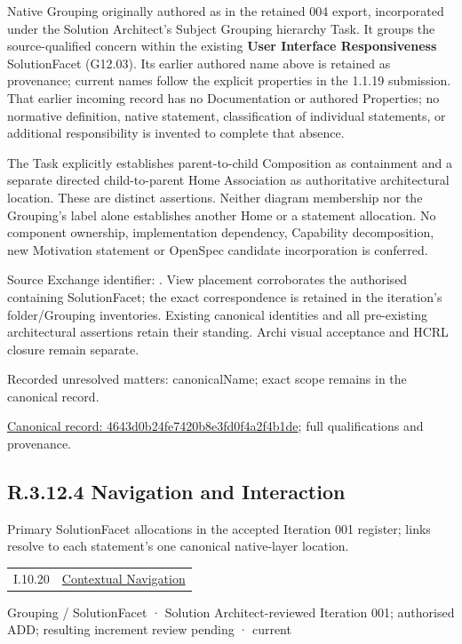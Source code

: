 Native Grouping originally authored as \texttt{} in the retained 004 export,
incorporated under the Solution Architect's Subject Grouping hierarchy Task.
It groups the source-qualified \texttt{} concern within
the existing \textbf{User Interface Responsiveness} SolutionFacet (G12.03). Its earlier authored name above is retained as provenance; current names
follow the explicit properties in the 1.1.19 submission.
That earlier incoming record has no Documentation or authored Properties; no normative
definition, native statement, classification of individual statements, or
additional responsibility is invented to complete that absence.



The Task explicitly establishes parent-to-child Composition as containment and
a separate directed child-to-parent Home Association as authoritative architectural
location. These are distinct assertions. Neither diagram membership nor the
Grouping's label alone establishes another Home or a statement allocation.
No component ownership, implementation dependency, Capability decomposition,
new Motivation statement or OpenSpec candidate incorporation is conferred.



Source Exchange identifier: \texttt{}. View placement corroborates
the authorised containing SolutionFacet; the exact correspondence is retained in the
iteration's folder/Grouping inventories. Existing canonical identities and all
pre-existing architectural assertions retain their standing. Archi visual
acceptance and HCRL closure remain separate.


{\small Recorded unresolved matters: canonicalName; exact scope remains in the canonical record.}\par
{\footnotesize \href{../../../../../../../continuum/grouping/4643d0b24fe7420b8e3fd0f4a2f4b1de.md}{Canonical record: 4643d0b24fe7420b8e3fd0f4a2f4b1de}; full qualifications and provenance.}\par
\subsection*{R.3.12.4 Navigation and Interaction}
\label{navigation:R.3.12.4}

Primary SolutionFacet allocations in the accepted Iteration 001 register; links resolve to each statement’s one canonical native-layer location.\par
\begin{longtable}{p{.22\linewidth}p{.73\linewidth}}
I.10.20 & \hyperref[element:39d698ff446d48ab9358844666fcafe5]{Contextual Navigation} \\
\end{longtable}
\label{element:9f192036bee542ad883b89729a35bbfb}
{\small Grouping / SolutionFacet · Solution Architect-reviewed Iteration 001; authorised ADD; resulting increment review pending · current}\par

